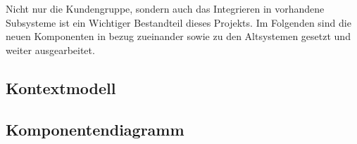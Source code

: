 Nicht nur die Kundengruppe, sondern auch das Integrieren in vorhandene Subsysteme ist ein Wichtiger Bestandteil dieses Projekts. Im Folgenden sind die neuen Komponenten in bezug zueinander sowie zu den Altsystemen gesetzt und weiter ausgearbeitet.

\subsection{Kontextmodell}\label{subsec:kontextmodell}
    

\subsection{Komponentendiagramm}\label{subsec:komponentendiagramm}
    